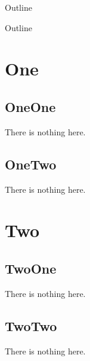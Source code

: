 \documentclass{beamer}
\begin{document}
{
\begin{frame}{Outline}
    \tableofcontents
\end{frame}
}

\begin{frame}{Outline}
    \tableofcontents[pausesubsections]
\end{frame}

\section{One}

\subsection{OneOne}
\begin{frame}
    There is nothing here.
\end{frame}

\subsection{OneTwo}
\begin{frame}
    There is nothing here.
\end{frame}


\section{Two}

\subsection{TwoOne}
\begin{frame}
    There is nothing here.
\end{frame}

\subsection{TwoTwo}
\begin{frame}
    There is nothing here.
\end{frame}
\end{document}
